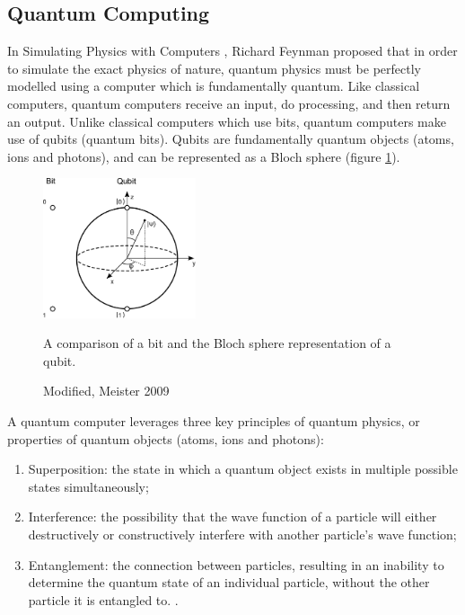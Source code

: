 \documentclass[12pt, a4paper]{article}
\begin{document}
\subsection{Quantum Computing}
In Simulating Physics with Computers \citep{Feynman1982}, Richard Feynman proposed that in order to simulate the exact physics of nature, quantum physics must be perfectly modelled using a computer which is fundamentally quantum. Like classical computers, quantum computers receive an input, do processing, and then return an output. Unlike classical computers which use bits, quantum computers make use of qubits (quantum bits). Qubits are fundamentally quantum objects (atoms, ions and photons), and can be represented as a Bloch sphere (figure \ref{fig:bloch_sphere}).
\begin{figure}[h]
    \centering
    \includegraphics[width=0.4\textwidth]{bloch_sphere}
    \caption{A comparison of a bit and the Bloch sphere representation of a qubit.}
    \caption*{Modified, Meister 2009}
    \label{fig:bloch_sphere}
\end{figure}
A quantum computer leverages three key principles of quantum physics, or properties of quantum objects (atoms, ions and photons):
\begin{enumerate}
\item Superposition: the state in which a quantum object exists in multiple possible states simultaneously;
\item Interference: the possibility that the wave function of a particle will either destructively or constructively interfere with another particle’s wave function;
\item Entanglement: the connection between particles, resulting in an inability to determine the quantum state of an individual particle, without the other particle it is entangled to.
\citep{doi:10.1142/q0243}.
\end{enumerate}
\end{document}
